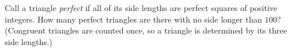 Call a triangle \emph{perfect} if all of its side lengths are perfect squares of positive integers. How many perfect triangles are there with no side longer than $100$? (Congruent triangles are counted once, so a triangle is determined by its three side lengths.)
